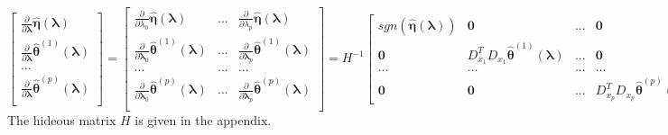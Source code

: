 \documentclass[12pt,letterpaper]{article}
\begin{document}
\begin{equation}
\begin{bmatrix}
\frac{\partial}{\partial \boldsymbol{\lambda}} \hat{\boldsymbol\eta}(\boldsymbol{\lambda})\\
\frac{\partial}{\partial \boldsymbol{\lambda}} \hat{\boldsymbol\theta}^{(1)}(\boldsymbol{\lambda})\\
...\\
\frac{\partial}{\partial \boldsymbol{\lambda}} \hat{\boldsymbol\theta}^{(p)}(\boldsymbol{\lambda})\\
\end{bmatrix}
=
\begin{bmatrix}
\frac{\partial}{\partial \lambda_0} \hat{\boldsymbol\eta}(\boldsymbol{\lambda}) & ... & \frac{\partial}{\partial \lambda_p} \hat{\boldsymbol\eta}(\boldsymbol{\lambda}) \\
\frac{\partial}{\partial \boldsymbol{\lambda}_0} \hat{\boldsymbol\theta}^{(1)}(\boldsymbol{\lambda}) & ... & 
\frac{\partial}{\partial \boldsymbol{\lambda}_p} \hat{\boldsymbol\theta}^{(1)}(\boldsymbol{\lambda}) \\
... & ... & ...\\
\frac{\partial}{\partial \boldsymbol{\lambda}_0} \hat{\boldsymbol\theta}^{(p)}(\boldsymbol{\lambda}) & ... & 
\frac{\partial}{\partial \boldsymbol{\lambda}_p} \hat{\boldsymbol\theta}^{(p)}(\boldsymbol{\lambda})\\
\end{bmatrix}
=
H^{-1}
\begin{bmatrix}
sgn \left ( \hat {\boldsymbol \eta} (\boldsymbol \lambda) \right ) & \boldsymbol {0} & ... & \boldsymbol {0}\\
\boldsymbol {0} & D_{x_1}^T D_{x_1} \hat{\boldsymbol \theta}^{(1)} (\boldsymbol \lambda) & ... & \boldsymbol {0}\\
... & ... & ... & ...\\
\boldsymbol {0} & \boldsymbol {0} & ... & D_{x_p}^T D_{x_p} \hat{\boldsymbol \theta}^{(p)} (\boldsymbol \lambda)
\end{bmatrix}
\end{equation}
The hideous matrix $H$ is given in the appendix.
\end{document}
